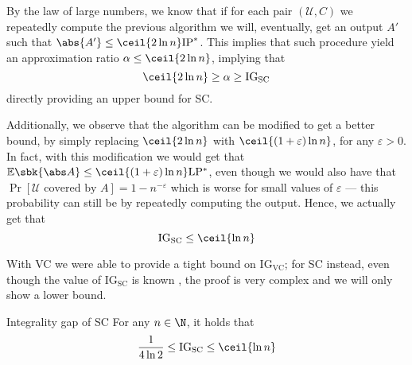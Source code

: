 \documentclass[a4paper, 12pt]{report}
\begin{document}
    By the law of large numbers, we know that if for each pair $(\mathcal U, C)$ we repeatedly compute the previous algorithm we will, eventually, get an output $A'$ such that $\abs{A'} \le \ceil{2 \ln n} \mathrm{IP}^*$. This implies that such procedure yield an approximation ratio $\alpha \le \ceil{2 \ln n}$, implying that $$\ceil{2 \ln n } \ge \alpha \ge \mathrm{IG}_{\mathrm{SC}}$$ directly providing an upper bound for SC.

    Additionally, we observe that the algorithm can be modified to get a better bound, by simply replacing $\ceil{2 \ln n}$ with $\ceil{(1 + \varepsilon) \ln n}$, for any $\varepsilon > 0$. In fact, with this modification we would get that $\mathbb E \sbk{\abs A} \le \ceil{(1 + \varepsilon) \ln n} \mathrm{LP^*}$, even though we would also have that $\Pr[\mbox{$\mathcal U$ covered by $A$}] = 1 - n^{- \varepsilon}$ which is worse for small values of $\varepsilon$ --- this probability can still be  by repeatedly computing the output. Hence, we actually get that $$\mathrm{IG}_{\mathrm{SC}} \le \ceil{\ln n}$$

    With VC we were able to provide a tight bound on $\mathrm{IG_{VC}}$; for SC instead, even though the value of $\mathrm{IG_{SC}}$ is known \cite{ig_sc}, the proof is very complex and we will only show a lower bound.

    \begin{framedthm}{Integrality gap of SC}
        For any $n \in \N$, it holds that $$\dfrac{1}{4 \ln 2} \le \mathrm{IG_{SC}} \le \ceil{\ln n}$$
    \end{framedthm}
    
\end{document}
